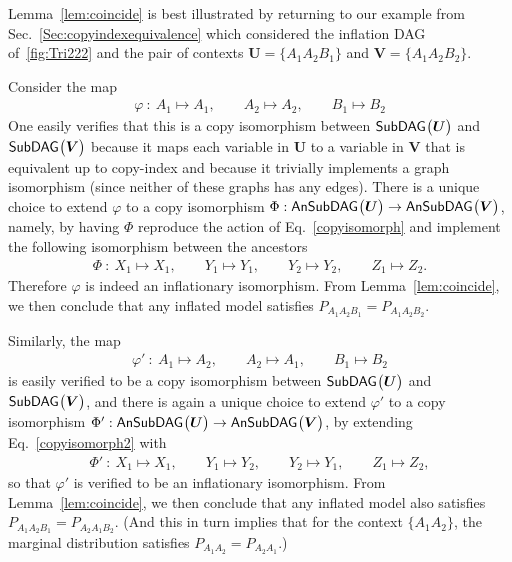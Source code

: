 Lemma~\ref{lem:coincide} is best illustrated by returning to our example from Sec.~\ref{Sec:copyindexequivalence} 
which considered the inflation DAG of~\cref{fig:Tri222} and the pair of contexts $\bm{U} = \{ A_1 A_2 B_1\}$ and $\bm{V} =\{ A_1 A_2 B_2\}$.  

Consider the map 
\begin{align}\label{copyisomorph}
	\varphi \: : \: A_1 \mapsto A_1,\qquad A_2\mapsto A_2,\qquad B_1\mapsto B_2
\end{align}
One easily verifies that this is a copy isomorphism between ${\operatorname{\mathsf{SubDAG}}_{}}\bigl\lparen\bm{U}\bigr\rparen$ and ${\operatorname{\mathsf{SubDAG}}_{}}\bigl\lparen\bm{V}\bigr\rparen$
because it maps each variable in $\bm{U}$ to a variable in $\bm{V}$ that is equivalent up to copy-index  and because it trivially implements a graph isomorphism (since neither of these graphs has any edges). There is a unique choice to extend $\varphi$ to a copy isomorphism $\Phi:{\operatorname{\mathsf{AnSubDAG}}_{}}\bigl\lparen\bm{U}\bigr\rparen\to{\operatorname{\mathsf{AnSubDAG}}_{}}\bigl\lparen\bm{V}\bigr\rparen$, namely, by having $\Phi$ reproduce the action of Eq.~\eqref{copyisomorph} and implement the following isomorphism between the ancestors
\begin{align}
\Phi \: : \: X_1\mapsto X_1,\qquad Y_1\mapsto Y_1, \qquad Y_2 \mapsto Y_2, \qquad Z_1 \mapsto Z_2.
\end{align}
Therefore $\varphi$ is indeed an inflationary isomorphism. From Lemma~\ref{lem:coincide}, we then conclude that any inflated model satisfies $P_{A_1 A_2 B_1} = P_{A_1 A_2 B_2}$.

Similarly, the map 
\begin{align}\label{copyisomorph2}
	\varphi' \: : \: A_1 \mapsto A_2,\qquad A_2\mapsto A_1,\qquad B_1\mapsto B_2
\end{align}
is easily verified to be a copy isomorphism between ${\operatorname{\mathsf{SubDAG}}_{}}\bigl\lparen\bm{U}\bigr\rparen$ and ${\operatorname{\mathsf{SubDAG}}_{}}\bigl\lparen\bm{V}\bigr\rparen$, and there is again a unique choice to extend $\varphi'$ to a copy isomorphism $\Phi':{\operatorname{\mathsf{AnSubDAG}}_{}}\bigl\lparen\bm{U}\bigr\rparen\to{\operatorname{\mathsf{AnSubDAG}}_{}}\bigl\lparen\bm{V}\bigr\rparen$, by extending Eq.~\eqref{copyisomorph2} with
\begin{align}
\Phi' \: : \: X_1\mapsto X_1,\qquad Y_1\mapsto Y_2, \qquad Y_2 \mapsto Y_1, \qquad Z_1 \mapsto Z_2,
\end{align}
so that $\varphi'$ is verified to be an inflationary isomorphism. From Lemma~\ref{lem:coincide}, we then conclude that any inflated model also satisfies $P_{A_1 A_2 B_1} = P_{A_2 A_1 B_2}$.  (And this in turn implies that for the context $\{A_1 A_2\}$, the marginal distribution satisfies $P_{A_1 A_2} = P_{A_2 A_1}$.)


